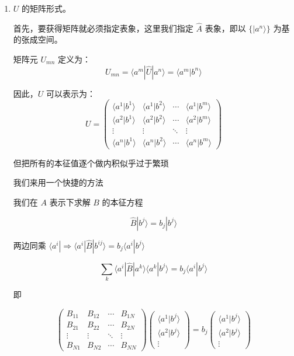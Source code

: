 \documentclass[lang=cn,15pt]{elegantbook}
\begin{document}
\begin{enumerate}
	\item $U$ 的矩阵形式。
	
	首先，要获得矩阵就必须指定表象，这里我们指定 $\hat{A}$ 表象，即以 $\{ |a^n\rangle \}$ 为基的张成空间。
	
	矩阵元 $U_{mn}$ 定义为：
	\[
	U_{mn} = \langle a^m | \hat{U} | a^n \rangle = \langle a^m | b^n \rangle
	\]
	
	因此，$U$ 可以表示为：
	\[
	U = \begin{pmatrix}
		\langle a^1 | b^1 \rangle & \langle a^1 | b^2 \rangle & \cdots & \langle a^1 | b^m \rangle \\
		\langle a^2 | b^1 \rangle & \langle a^2 | b^2 \rangle & \cdots & \langle a^2 | b^m \rangle \\
		\vdots & \vdots & \ddots & \vdots \\
		\langle a^n | b^1 \rangle & \langle a^n | b^2 \rangle & \cdots & \langle a^n | b^m \rangle
	\end{pmatrix}
	\]
	
	但把所有的本征值逐个做内积似乎过于繁琐
	
	我们来用一个快捷的方法
	
	我们在 $A$ 表示下求解 $B$ 的本征方程
	
	\[
	\hat{B} | b^{j} \rangle = b_j | b^{j} \rangle
	\]
	
	两边同乘 $\langle a^{i} | \Rightarrow \langle a^{i} | \hat{B} | b^{ij} \rangle = b_j \langle a^{i} | b^{j} \rangle$
	
	\[
	\sum_k \langle a^{i} | \hat{B} | a^{k} \rangle \langle a^{k} | b^{j} \rangle = b_j \langle a^{i} | b^{j} \rangle
	\]
	
	即
	
	\[
	\begin{pmatrix}
		B_{11} & B_{12} & \cdots & B_{1N} \\
		B_{21} & B_{22} & \cdots & B_{2N} \\
		\vdots & \vdots & \ddots & \vdots \\
		B_{N1} & B_{N2} & \cdots & B_{NN}
	\end{pmatrix}
	\begin{pmatrix}
		\langle a^{1} | b^{j} \rangle \\
		\langle a^{2} | b^{j} \rangle \\
		\vdots
	\end{pmatrix}
	=
	b_j
	\begin{pmatrix}
		\langle a^{1} | b^{j} \rangle \\
		\langle a^{2} | b^{j} \rangle \\
		\vdots
	\end{pmatrix}
	\]
	

\end{enumerate}
\end{document}
